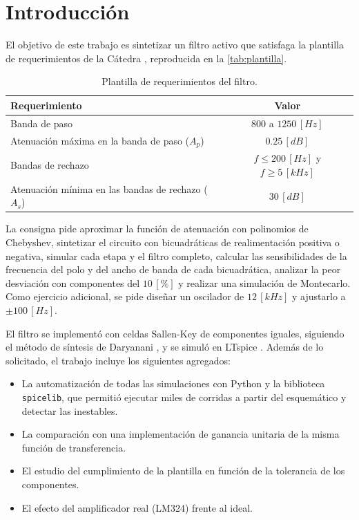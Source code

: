 \documentclass[12pt]{article}
\begin{document}
\tableofcontents
\newpage
\listoffigures
\newpage
\listoftables
\newpage

\section{Introducción}
\label{sec_1}
El objetivo de este trabajo es sintetizar un filtro activo que satisfaga la plantilla de requerimientos de la Cátedra \cite{guia}, reproducida en la \autoref{tab:plantilla}.

\begin{table}[H]
    \centering
    \caption{Plantilla de requerimientos del filtro.}
    \label{tab:plantilla}
    \begin{tabular}{|l|c|}
        \hline
        \textbf{Requerimiento} & \textbf{Valor} \\
        \hline
        Banda de paso & $800$ a $1250 \, [Hz]$ \\
        Atenuación máxima en la banda de paso ($A_p$) & $0.25 \, [dB]$ \\
        Bandas de rechazo & $f \leq 200 \, [Hz]$ y $f \geq 5 \, [kHz]$ \\
        Atenuación mínima en las bandas de rechazo ($A_s$) & $30 \, [dB]$ \\
        \hline
    \end{tabular}
\end{table}

La consigna pide aproximar la función de atenuación con polinomios de Chebyshev, sintetizar el circuito con bicuadráticas de realimentación positiva o negativa, simular cada etapa y el filtro completo, calcular las sensibilidades de la frecuencia del polo y del ancho de banda de cada bicuadrática, analizar la peor desviación con componentes del $10 \, [\%]$ y realizar una simulación de Montecarlo. Como ejercicio adicional, se pide diseñar un oscilador de $12 \, [kHz]$ y ajustarlo a $\pm 100 \, [Hz]$.

El filtro se implementó con celdas Sallen-Key de componentes iguales, siguiendo el método de síntesis de Daryanani \cite{daryanani}, y se simuló en LTspice \cite{ltspice}. Además de lo solicitado, el trabajo incluye los siguientes agregados:
\begin{itemize}
    \item La automatización de todas las simulaciones con Python y la biblioteca \texttt{spicelib}, que permitió ejecutar miles de corridas a partir del esquemático y detectar las inestables.
    \item La comparación con una implementación de ganancia unitaria de la misma función de transferencia.
    \item El estudio del cumplimiento de la plantilla en función de la tolerancia de los componentes.
    \item El efecto del amplificador real (LM324) frente al ideal.
\end{itemize}
\end{document}

